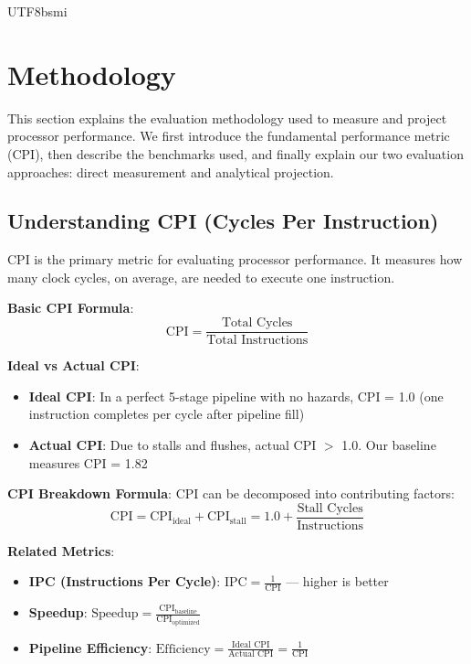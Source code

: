 \documentclass[journal,twoside]{IEEEtran}
\begin{document}
\begin{CJK}{UTF8}{bsmi}
\section{Methodology}

This section explains the evaluation methodology used to measure and project processor performance. We first introduce the fundamental performance metric (CPI), then describe the benchmarks used, and finally explain our two evaluation approaches: direct measurement and analytical projection.

\subsection{Understanding CPI (Cycles Per Instruction)}
CPI is the primary metric for evaluating processor performance. It measures how many clock cycles, on average, are needed to execute one instruction.

\textbf{Basic CPI Formula}:
\begin{equation}
\text{CPI} = \frac{\text{Total Cycles}}{\text{Total Instructions}}
\label{eq:cpi}
\end{equation}

\textbf{Ideal vs Actual CPI}:
\begin{itemize}
    \item \textbf{Ideal CPI}: In a perfect 5-stage pipeline with no hazards, CPI = 1.0 (one instruction completes per cycle after pipeline fill)
    \item \textbf{Actual CPI}: Due to stalls and flushes, actual CPI $>$ 1.0. Our baseline measures CPI = 1.82
\end{itemize}

\textbf{CPI Breakdown Formula}: CPI can be decomposed into contributing factors:
\begin{equation}
\text{CPI} = \text{CPI}_{\text{ideal}} + \text{CPI}_{\text{stall}} = 1.0 + \frac{\text{Stall Cycles}}{\text{Instructions}}
\label{eq:cpibreak}
\end{equation}

\textbf{Related Metrics}:
\begin{itemize}
    \item \textbf{IPC (Instructions Per Cycle)}: $\text{IPC} = \frac{1}{\text{CPI}}$ --- higher is better
    \item \textbf{Speedup}: $\text{Speedup} = \frac{\text{CPI}_{\text{baseline}}}{\text{CPI}_{\text{optimized}}}$
    \item \textbf{Pipeline Efficiency}: $\text{Efficiency} = \frac{\text{Ideal CPI}}{\text{Actual CPI}} = \frac{1}{\text{CPI}}$
\end{itemize}


\end{CJK}
\end{document}
